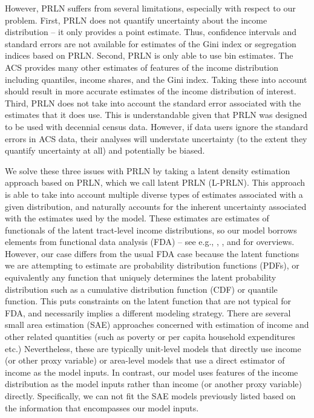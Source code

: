 \documentclass[12pt]{article}
\begin{document}
However, PRLN suffers from several limitations, especially with respect to our problem. First, PRLN does not quantify uncertainty about the income distribution -- it only provides a point estimate. Thus, confidence intervals and standard errors are not available for estimates of the Gini index or segregation indices based on PRLN. Second, PRLN is only able to use bin estimates. The ACS provides many other estimates of features of the income distribution including quantiles, income shares, and the Gini index. Taking these into account should result in more accurate estimates of the income distribution of interest. Third, PRLN does not take into account the standard error associated with the estimates that it does use. This is understandable given that PRLN was designed to be used with decennial census data. However, if data users ignore the standard errors in ACS data, their analyses will understate uncertainty (to the extent they quantify uncertainty at all) and potentially be biased.

We solve these three issues with PRLN by taking a latent density estimation approach based on PRLN, which we call latent PRLN (L-PRLN). This approach is able to take into account multiple diverse types of estimates associated with a given distribution, and naturally accounts for the inherent uncertainty associated with the estimates used by the model. These estimates are estimates of functionals of the latent tract-level income distributions, so our model borrows elements from functional data analysis (FDA) -- see e.g., \citet{ramsay2006functional}, \citet{ferraty2006nonparametric}, and \citet{kokoszka2017introduction} for overviews. However, our case differs from the usual FDA case because the latent functions we are attempting to estimate are probability distribution functions (PDFs), or equivalently any function that uniquely determines the latent probability distribution such as a cumulative distribution function (CDF) or quantile function. This puts constraints on the latent function that are not typical for FDA, and necessarily implies a different modeling strategy. There are several small area estimation (SAE) approaches concerned with estimation of income and other related quantities (such as poverty or per capita household expenditures etc.) Nevertheless, these are typically unit-level models that directly use income (or other proxy variable) \citep[e.g., see][among others]{battese1988error,elbers2003micro,marchetti2012non,molina2010small,tarozzi2009using,tzavidis2008m} or area-level models \citep[e.g., see][]{fay1979estimates} that use a direct estimator of income as the model inputs. In contrast, our model uses features of the income distribution as the model inputs rather than income (or another proxy variable) directly. Specifically, we can not fit the SAE models previously listed based on the information that encompasses our model inputs.
\end{document}
